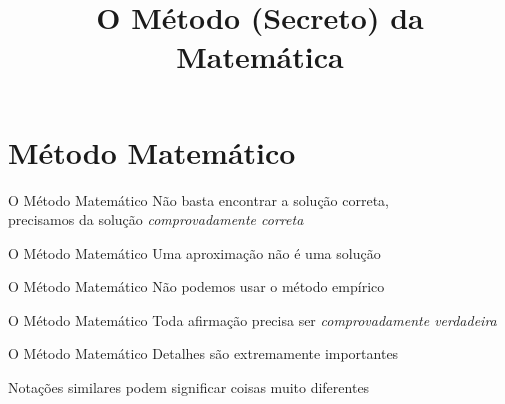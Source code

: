 \documentclass[fleqn,aspectratio=169,12pt]{beamer}
\title{O Método (Secreto) da Matemática}
\begin{document}
\addtitle

\section{Método Matemático}

\begin{frame}{O Método Matemático}
  Não basta encontrar a solução correta, \\[2mm]
  precisamos da solução \emph{comprovadamente correta}
\end{frame}

\begin{frame}{O Método Matemático}
  Uma aproximação não é uma solução
\end{frame}

\begin{frame}{O Método Matemático}
  Não podemos usar o método empírico
\end{frame}

\begin{frame}{O Método Matemático}
  Toda afirmação precisa ser \emph{comprovadamente verdadeira}
\end{frame}

\begin{frame}{O Método Matemático}
  Detalhes são extremamente importantes

  \pause
  Notações similares podem significar coisas muito diferentes
\end{frame}
\end{document}
